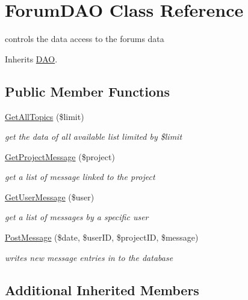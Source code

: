 \hypertarget{class_forum_d_a_o}{}\section{Forum\+D\+AO Class Reference}
\label{class_forum_d_a_o}


controls the data access to the forum\textquotesingle{}s data  




Inherits \hyperlink{class_d_a_o}{D\+AO}.

\subsection*{Public Member Functions}
\begin{DoxyCompactItemize}
\item 
\hyperlink{class_forum_d_a_o_af42bf7b4e50ddd06c68642bbed774f13}{Get\+All\+Topics} (\$limit)
\begin{DoxyCompactList}\small\item\em get the data of all available list limited by \$limit \end{DoxyCompactList}\item 
\hyperlink{class_forum_d_a_o_ab74cdef7ffe766572595268923a3a3a3}{Get\+Project\+Message} (\$project)
\begin{DoxyCompactList}\small\item\em get a list of message linked to the project \end{DoxyCompactList}\item 
\hyperlink{class_forum_d_a_o_a641bb747b67128db836bf231ece2ae74}{Get\+User\+Message} (\$user)
\begin{DoxyCompactList}\small\item\em get a list of messages by a specific user \end{DoxyCompactList}\item 
\hyperlink{class_forum_d_a_o_ac06809a2f0001b1ad909bebba40aefef}{Post\+Message} (\$date, \$user\+ID, \$project\+ID, \$message)
\begin{DoxyCompactList}\small\item\em writes new message entries in to the database \end{DoxyCompactList}\end{DoxyCompactItemize}
\subsection*{Additional Inherited Members}


